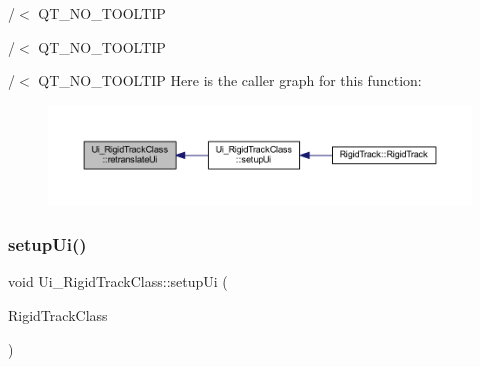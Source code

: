/$<$ Q\+T\+\_\+\+N\+O\+\_\+\+T\+O\+O\+L\+T\+IP

/$<$ Q\+T\+\_\+\+N\+O\+\_\+\+T\+O\+O\+L\+T\+IP

/$<$ Q\+T\+\_\+\+N\+O\+\_\+\+T\+O\+O\+L\+T\+IP Here is the caller graph for this function\+:\nopagebreak
\begin{figure}[H]
\begin{center}
\leavevmode
\includegraphics[width=350pt]{class_ui___rigid_track_class_a7c96951c4e173848e7695d6bd7883af6_icgraph}
\end{center}
\end{figure}
\mbox{\label{class_ui___rigid_track_class_a7f78fefc15716049b873bef4d3450e38}} 
\subsubsection{\texorpdfstring{setup\+Ui()}{setupUi()}}
{\footnotesize\ttfamily void Ui\+\_\+\+Rigid\+Track\+Class\+::setup\+Ui (\begin{DoxyParamCaption}\item[{Q\+Main\+Window $\ast$}]{Rigid\+Track\+Class }\end{DoxyParamCaption})\hspace{0.3cm}{\ttfamily [inline]}}

